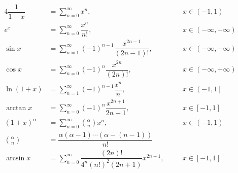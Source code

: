 \begin{alignat*}{4}
    \dfrac{1}{1-x} &= \sum_{n=0}^{\infty} x^n, \quad &&x\in (-1, 1) \\
    e^x &= \sum_{n=0}^\infty\dfrac{x^n}{n!}, &&x \in(-\infty, +\infty) \\
    \sin x &= \sum_{n=1}^\infty (-1)^{n-1} \dfrac{x^{2n-1}}{(2n-1)!}, \quad&&x \in (-\infty, +\infty) \\
    \cos x &= \sum_{n=0}^\infty (-1)^{n} \dfrac{x^{2n}}{(2n)!}, \quad&&x \in (-\infty, +\infty) \\
    \ln{(1+x)} &= \sum_{n=1}^\infty (-1)^{n-1} \dfrac{x^n}{n}, \quad&&x \in \left(-1, 1\right] \\
    \arctan x &= \sum_{n=0}^\infty (-1)^n \dfrac{x^{2n+1}}{2n+1}, \quad&&x \in [-1, 1] \\
    (1+x)^\alpha &= \sum_{n=0}^\infty \binom{\alpha}{n} x^n, \quad&&x \in (-1, 1) \\
    \binom{\alpha}{n} &= \dfrac{\alpha(\alpha-1)\cdots(\alpha-(n-1))}{n!} \\
    \arcsin x &= \sum_{n=0}^\infty \dfrac{(2n)!}{4^n(n!)^2(2n+1)}x^{2n+1}, \quad&&x \in [-1, 1]
\end{alignat*}


\endgroup